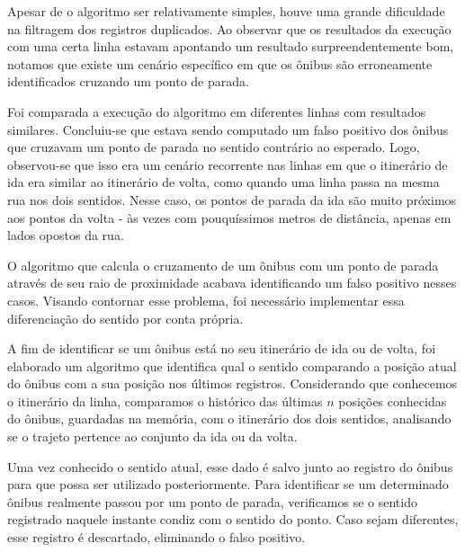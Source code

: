Apesar de o algoritmo ser relativamente simples, houve uma grande dificuldade na filtragem dos registros duplicados. Ao observar que os resultados da execução com uma certa linha estavam apontando um resultado surpreendentemente bom, notamos que existe um cenário específico em que os ônibus são erroneamente identificados cruzando um ponto de parada.

Foi comparada a execução do algoritmo em diferentes linhas com resultados similares. Concluiu-se que estava sendo computado um falso positivo dos ônibus que cruzavam um ponto de parada no sentido contrário ao esperado. Logo, observou-se que isso era um cenário recorrente nas linhas em que o itinerário de ida era similar ao itinerário de volta, como quando uma linha passa na mesma rua nos dois sentidos. Nesse caso, os pontos de parada da ida são muito próximos aos pontos da volta - às vezes com pouquíssimos metros de distância, apenas em lados opostos da rua.

O algoritmo que calcula o cruzamento de um ônibus com um ponto de parada através de seu raio de proximidade acabava identificando um falso positivo nesses casos. Visando contornar esse problema, foi necessário implementar essa diferenciação do sentido por conta própria.

A fim de identificar se um ônibus está no seu itinerário de ida ou de volta, foi elaborado um algoritmo que identifica qual o sentido comparando a posição atual do ônibus com a sua posição nos últimos registros. Considerando que conhecemos o itinerário da linha, comparamos o histórico das últimas $n$ posições conhecidas do ônibus, guardadas na memória, com o itinerário dos dois sentidos, analisando se o trajeto pertence ao conjunto da ida ou da volta.

Uma vez conhecido o sentido atual, esse dado é salvo junto ao registro do ônibus para que possa ser utilizado posteriormente. Para identificar se um determinado ônibus realmente passou por um ponto de parada, verificamos se o sentido registrado naquele instante condiz com o sentido do ponto. Caso sejam diferentes, esse registro é descartado, eliminando o falso positivo.
